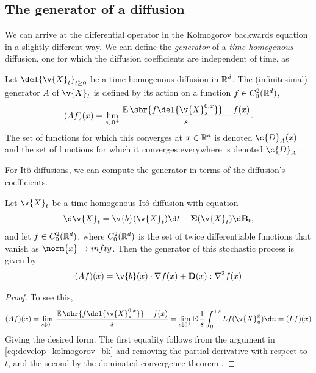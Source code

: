 \subsection{The generator of a diffusion}
We can arrive at the differential operator in the Kolmogorov backwards equation in a slightly different way.
We can define the \emph{generator} of a \emph{time-homogenous} diffusion, one for which the diffusion coefficients are independent of time, as
\begin{definition}
	\label{def:generator}
	Let \(\del{\v{X}_t}_{t\geq 0}\) be a time-homogenous diffusion in \(\mathbb{R}^d\).
	The (infinitesimal) generator \(A\) of \(\v{X}_t\) is defined by its action on a function \(f \in C_0^2(\mathbb{R}^d)\), 
	\[(Af)(x) = \lim_{s\downarrow 0^+}\frac{\E\sbr{f\del{\v{X}_{s}^{0,x}}} - f(x)}{s}.\]
	The set of functions for which this converges at \(x\in \mathbb{R}^d\) is denoted \(\c{D}_A(x)\) and the set of functions for which it converges everywhere is denoted \(\c{D}_A\).
\end{definition}
For {I}t\^o diffusions, we can compute the generator in terms of the diffusion's coefficients.
\begin{theorem}
	\label{thm:ito_generator}
	Let \(\v{X}_t\) be a time-homogenous {I}t\^o diffusion with equation 
	\[\d\v{X}_t = \v{b}(\v{X}_t) \d t + \m{\Sigma}(\v{X}_t) \d \m{B}_t,\]
	and let \(f \in C_0^2(\mathbb{R}^d)\), where \(C_0^2(\mathbb{R}^d)\) is the set of twice differentiable functions that vanish as \(\norm{x} \to infty\).
	Then the generator of this stochastic process is given by
	\[(Af)(x) = \v{b}(x) \cdot \nabla f(x) + \m{D}(x) : \nabla^2 f(x) \label{eq:generator_at_0}	\]
\end{theorem}
\begin{proof}
	To see this, 
	\[
		(Af)(x) = \lim_{s\downarrow 0^+}\frac{\E\sbr{f\del{\v{X}_{s}^{0,x}}} - f(x)}{s} = \lim_{s\downarrow 0^+} \E \frac{1}{s}\int_0^{+s} L f(\v{X}_u^x)\d u = (Lf)(x)
	\]
	Giving the desired form.
	The first equality follows from the argument in \cref{eq:develop_kolmogorov_bk} and removing the partial derivative with respect to \(t\), and the second by the dominated convergence theorem \cite[Theorem 1.21]{kallenberg1997foundations}.
\end{proof}

